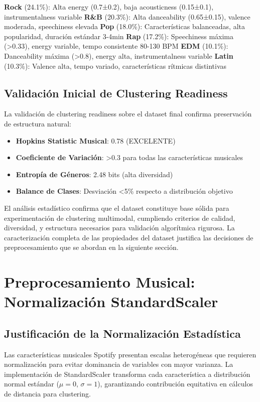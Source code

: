 \documentclass[12pt,a4paper]{report}
\begin{document}
\textbf{Rock} (24.1\%): Alta energy (0.7±0.2), baja acousticness (0.15±0.1), instrumentalness variable
\textbf{R\&B} (20.3\%): Alta danceability (0.65±0.15), valence moderada, speechiness elevada
\textbf{Pop} (18.0\%): Características balanceadas, alta popularidad, duración estándar 3-4min
\textbf{Rap} (17.2\%): Speechiness máxima (>0.33), energy variable, tempo consistente 80-130 BPM
\textbf{EDM} (10.1\%): Danceability máxima (>0.8), energy alta, instrumentalness variable
\textbf{Latin} (10.3\%): Valence alta, tempo variado, características rítmicas distintivas

\subsection{Validación Inicial de Clustering Readiness}

La validación de clustering readiness sobre el dataset final confirma preservación de estructura natural:

\begin{itemize}
\item \textbf{Hopkins Statistic Musical}: 0.78 (EXCELENTE)
\item \textbf{Coeficiente de Variación}: >0.3 para todas las características musicales
\item \textbf{Entropía de Géneros}: 2.48 bits (alta diversidad)
\item \textbf{Balance de Clases}: Desviación <5\% respecto a distribución objetivo
\end{itemize}

El análisis estadístico confirma que el dataset constituye base sólida para experimentación de clustering multimodal, cumpliendo criterios de calidad, diversidad, y estructura necesarios para validación algorítmica rigurosa. La caracterización completa de las propiedades del dataset justifica las decisiones de preprocesamiento que se abordan en la siguiente sección.

\section{Preprocesamiento Musical: Normalización StandardScaler}

\subsection{Justificación de la Normalización Estadística}

Las características musicales Spotify presentan escalas heterogéneas que requieren normalización para evitar dominancia de variables con mayor varianza. La implementación de StandardScaler transforma cada característica a distribución normal estándar ($\mu=0$, $\sigma=1$), garantizando contribución equitativa en cálculos de distancia para clustering.
\end{document}
